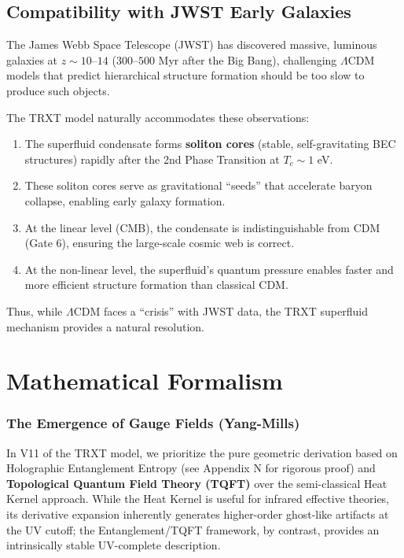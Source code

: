 \documentclass[a4paper,12pt]{article}
\begin{document}
\subsection{Compatibility with JWST Early Galaxies}
The James Webb Space Telescope (JWST) has discovered massive, luminous galaxies at $z \sim 10$--$14$ ($300$--$500$ Myr after the Big Bang), challenging $\Lambda$CDM models that predict hierarchical structure formation should be too slow to produce such objects.

The TRXT model naturally accommodates these observations:
\begin{enumerate}
    \item The superfluid condensate forms \textbf{soliton cores} (stable, self-gravitating BEC structures) rapidly after the 2nd Phase Transition at $T_c \sim 1$ eV.
    \item These soliton cores serve as gravitational ``seeds'' that accelerate baryon collapse, enabling early galaxy formation.
    \item At the linear level (CMB), the condensate is indistinguishable from CDM (Gate 6), ensuring the large-scale cosmic web is correct.
    \item At the non-linear level, the superfluid's quantum pressure enables faster and more efficient structure formation than classical CDM.
\end{enumerate}
Thus, while $\Lambda$CDM faces a ``crisis'' with JWST data, the TRXT superfluid mechanism provides a natural resolution.

\section{Mathematical Formalism}

\subsubsection{The Emergence of Gauge Fields (Yang-Mills)}
In V11 of the TRXT model, we prioritize the pure geometric derivation based on Holographic Entanglement Entropy (see Appendix N for rigorous proof) and \textbf{Topological Quantum Field Theory (TQFT)} over the semi-classical Heat Kernel approach. While the Heat Kernel is useful for infrared effective theories, its derivative expansion inherently generates higher-order ghost-like artifacts at the UV cutoff; the Entanglement/TQFT framework, by contrast, provides an intrinsically stable UV-complete description.
\end{document}
